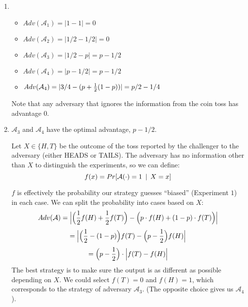 \documentclass[12pt]{article}
\begin{document}
{\begin{enumerate}
$$Adv(\mathcal{A}) = \Big|Pr[\mathcal{A}(0) = 1] - Pr[\mathcal{A}(1) = 1]\Big|$$
\item
\begin{itemize}
\item $Adv(\mathcal{A}_1) = |1 - 1| = 0$
\item $Adv(\mathcal{A}_2) = |1/2 - 1/2| = 0$
\item $Adv(\mathcal{A}_3) = |1/2 - p| = p-1/2$
\item $Adv(\mathcal{A}_4) = |p - 1/2| = p-1/2$
\item $Adv(\mathcal{A}_4) = |3/4 - (p + {1\over 2}(1-p))| = p/2-1/4$
\end{itemize}

Note that any adversary that ignores the information from the coin toss has advantage $0$.

\item $\mathcal{A}_3$ and $\mathcal{A}_4$ have the optimal advantage, $p - 1/2$.

Let $X \in \{H, T\}$ be the outcome of the toss reported by the challenger to the adversary (either HEADS or TAILS). The adversary has no information other than $X$ to distinguish the experiments, so we can define:
$$f(x) = Pr\Large[\mathcal{A}(\cdot) = 1~|~X=x\Large]$$

$f$ is effectively the probability our strategy guesses ``biased'' (Experiment $1$) in each case. We can split the probability into cases based on $X$:
$$Adv(\mathcal{A}) = \Big|
\Big({1\over2}f(H) + {1\over2}f(T)\Big)
-
\Big(p\cdot f(H) + (1-p)\cdot f(T)\Big)
\Big|$$
$$= \Big|
\Big({1\over2} - (1-p)\Big) f(T)
-
\Big(p - {1\over2}\Big) f(H)
\Big|$$
$$= \Big(p - {1\over2}\Big) \cdot \Big|
f(T) - f(H)
\Big|$$
The best strategy is to make sure the output is as different as possible depending on $X$. We could select $f(T) = 0$ and $f(H) = 1$, which corresponds to the strategy of adversary $\mathcal{A}_3$. (The opposite choice gives us $\mathcal{A}_4$).
\end{enumerate}
}
\end{document}
